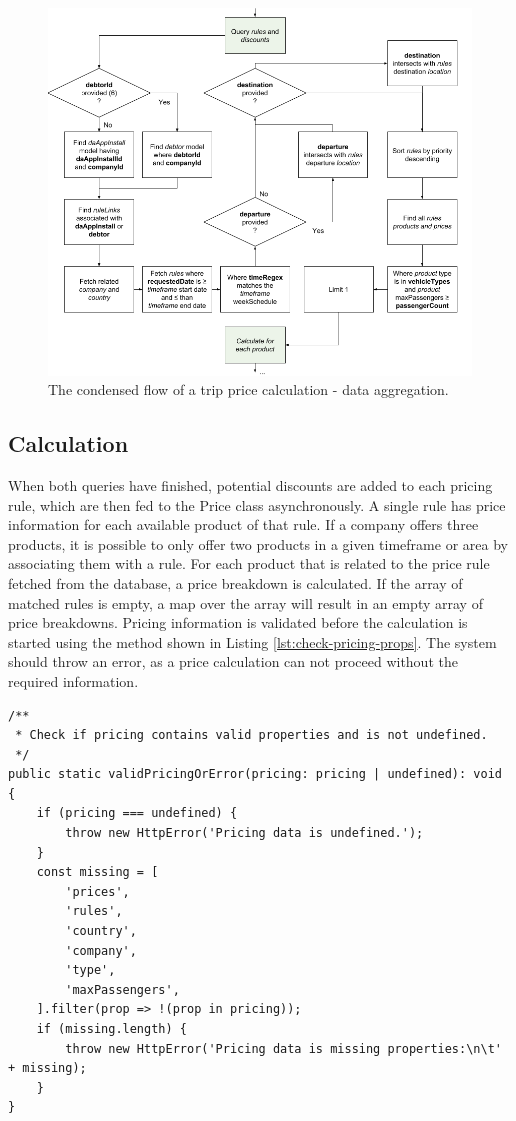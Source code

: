 \begin{figure}[H]
	\centering
	\includegraphics[width=.8\textwidth]{DataAggregation}
	\caption[Data Aggregation]{The condensed flow of a trip price calculation - data aggregation.}
	\label{fig:Data Aggregation}
\end{figure}

\subsection{Calculation}
When both queries have finished, potential discounts are added to each pricing rule, which are then fed to the Price class asynchronously. A single rule has price information for each available product of that rule. If a company offers three products, it is possible to only offer two products in a given timeframe or area by associating them with a rule. For each product that is related to the price rule fetched from the database, a price breakdown is calculated. If the array of matched rules is empty, a map over the array will result in an empty array of price breakdowns. Pricing information is validated before the calculation is started using the method shown in Listing \ref{lst:check-pricing-props}. The system should throw an error, as a price calculation can not proceed without the required information.

\begin{minipage}{\linewidth}
\begin{lstlisting}[caption={Find missing properties.}, label={lst:check-pricing-props}]
/**
 * Check if pricing contains valid properties and is not undefined.
 */
public static validPricingOrError(pricing: pricing | undefined): void {
	if (pricing === undefined) {
		throw new HttpError('Pricing data is undefined.');
	}
	const missing = [
		'prices',
		'rules',
		'country',
		'company',
		'type',
		'maxPassengers',
	].filter(prop => !(prop in pricing));
	if (missing.length) {
		throw new HttpError('Pricing data is missing properties:\n\t' + missing);
	}
}
\end{lstlisting}
\end{minipage}

